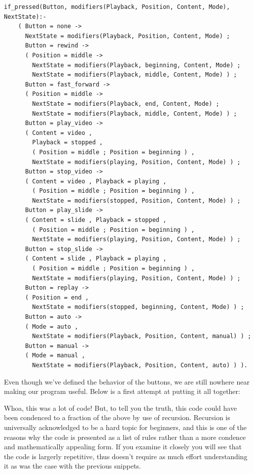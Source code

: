 \documentclass[11pt]{article}
\begin{document}
\begin{verbatim}
if_pressed(Button, modifiers(Playback, Position, Content, Mode), NextState):-
    ( Button = none ->
      NextState = modifiers(Playback, Position, Content, Mode) ;
      Button = rewind ->
      ( Position = middle ->
        NextState = modifiers(Playback, beginning, Content, Mode) ;
        NextState = modifiers(Playback, middle, Content, Mode) ) ;
      Button = fast_forward ->
      ( Position = middle ->
        NextState = modifiers(Playback, end, Content, Mode) ;
        NextState = modifiers(Playback, middle, Content, Mode) ) ;
      Button = play_video ->
      ( Content = video ,
        Playback = stopped ,
        ( Position = middle ; Position = beginning ) ,
        NextState = modifiers(playing, Position, Content, Mode) ) ;
      Button = stop_video ->
      ( Content = video , Playback = playing ,
        ( Position = middle ; Position = beginning ) ,
        NextState = modifiers(stopped, Position, Content, Mode) ) ;
      Button = play_slide ->
      ( Content = slide , Playback = stopped ,
        ( Position = middle ; Position = beginning ) ,
        NextState = modifiers(playing, Position, Content, Mode) ) ;
      Button = stop_slide ->
      ( Content = slide , Playback = playing ,
        ( Position = middle ; Position = beginning ) ,
        NextState = modifiers(playing, Position, Content, Mode) ) ;
      Button = replay ->
      ( Position = end ,
        NextState = modifiers(stopped, beginning, Content, Mode) ) ;
      Button = auto ->
      ( Mode = auto ,
        NextState = modifiers(Playback, Position, Content, manual) ) ;
      Button = manual ->
      ( Mode = manual ,
        NextState = modifiers(Playback, Position, Content, auto) ) ).
\end{verbatim}

   Even though we've defined the behavior of the buttons, we are still nowhere
near making our program useful.  Below is a first attempt at putting it all
together:

Whoa, this was a lot of code! But, to tell you the truth, this code could
have been condenced to a fraction of the above by use of recursion.
Recursion is universally acknowledged to be a hard topic for beginners, and
this is one of the reasons why the code is presented as a list of rules
rather than a more condence and mathematically appealing form.  If you
examine it closely you will see that the code is largerly repetitive, thus
doesn't require as much effort understanding it as was the case with the
previous snippets.
\end{document}
